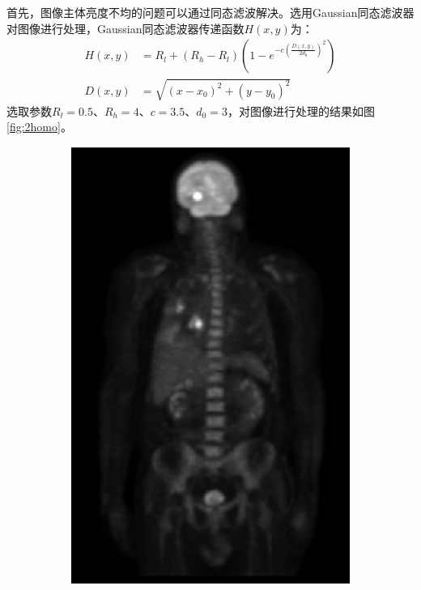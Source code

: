 \documentclass[a4paper]{ctexart}
\newcommand{\outwtwo}{0.4\textwidth}
\begin{document}
\begin{spacing}{1.35}
	首先，图像主体亮度不均的问题可以通过同态滤波解决。选用Gaussian同态滤波器对图像进行处理，Gaussian同态滤波器传递函数$H(x,y)$为\cite{RN151}：
	\begin{equation}
		\begin{split}
			H(x,y)&=R_l+(R_h-R_l)\left(1-e^{-c(\frac{D(x,y)}{2d_0})^2}\right)\\
			D(x,y)&=\sqrt{(x-x_0)^2+(y-y_0)^2}
		\end{split}
	\end{equation}
	选取参数$R_l=0.5$、$R_h=4$、$c=3.5$、$d_0=3$\cite{RN151}，对图像进行处理的结果如图\ref{fig:2homo}。
	\begin{figure}[htbp]
		\centering
		\begin{subfigure}[t]{\outwtwo}
			\centering
			\includegraphics[width=\textwidth]{figure/image2.jpg}

\end{subfigure}
\end{figure}
\end{spacing}
\end{document}
